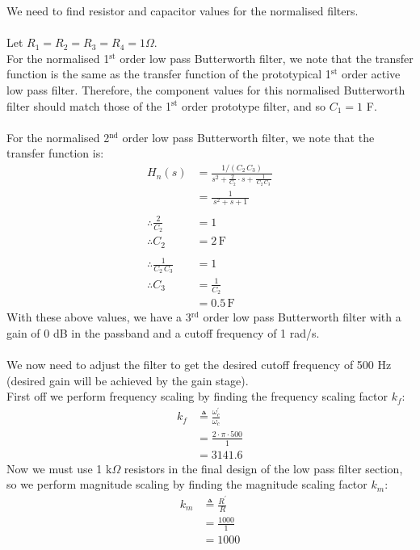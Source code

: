 We need to find resistor and capacitor values for the normalised filters.\\
\\
Let $R_1 = R_2 = R_3 = R_4 = 1 \Omega$.\\
For the normalised 1$^\text{st}$ order low pass Butterworth filter, we note that the transfer function is the same as the transfer function of the prototypical 1$^\text{st}$ order active low pass filter. Therefore, the component values for this normalised Butterworth filter should match those of the 1$^\text{st}$ order prototype filter, and so $C_1 = 1$ F.\\
\\
For the normalised 2$^\text{nd}$ order low pass Butterworth filter, we note that the transfer function is:
\begin{align*}
	H_n(s) &= \frac{1/(C_2 \, C_3)}{s^2 + \frac{2}{C_2} \cdot s + \frac{1}{\, C_2 \, C_3 \,}} \\
	&= \frac{1}{\, s^2 + s + 1 \,} \\
	\\
	\therefore \frac{2}{C_2} &= 1 \\
	\therefore C_2 &= 2 \, \text{F} \\
	\\
	\therefore \frac{1}{C_2 \, C_3} &= 1 \\
	\therefore C_3 &= \frac{1}{C_2} \\
	&= 0.5 \, \text{F}
\end{align*}
With these above values, we have a 3$^\text{rd}$ order low pass Butterworth filter with a gain of 0 dB in the passband and a cutoff frequency of 1 rad/s.\\
\\
We now need to adjust the filter to get the desired cutoff frequency of 500 Hz (desired gain will be achieved by the gain stage).\\
First off we perform frequency scaling by finding the frequency scaling factor $k_f$:
\begin{align*}
	k_f &\triangleq \frac{\omega_c^{'}}{\omega_c} \\
	&= \frac{2 \cdot \pi \cdot 500}{1} \\
	&= 3141.6
\end{align*}
Now we must use 1 k$\Omega$ resistors in the final design of the low pass filter section, so we perform magnitude scaling by finding the magnitude scaling factor $k_m$:
\begin{align*}
	k_m &\triangleq \frac{R^{'}}{R} \\
	&= \frac{1000}{1} \\
	&= 1000
\end{align*}
